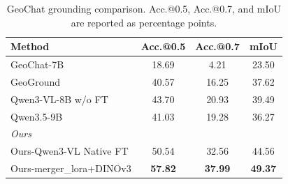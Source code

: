 \begin{table}[t]
  \caption{GeoChat grounding comparison. Acc.@0.5, Acc.@0.7, and mIoU are reported as percentage points.}
  \label{tab:GeoChat_grounding}
  \vspace{5pt}
  \centering
  \scriptsize
  \setlength{\tabcolsep}{6pt}
  \renewcommand{\arraystretch}{1.08}
  \begin{tabular}{lccc}
    \toprule
    Method & Acc.@0.5 & Acc.@0.7 & mIoU \\
    \midrule
    GeoChat-7B                       & 18.69          & 4.21           & 23.50          \\
    GeoGround                        & 40.57          & 16.25          & 37.62          \\
    Qwen3-VL-8B w/o FT               & 43.70          & 20.93          & 39.49          \\
    Qwen3.5-9B                       & 41.03          & 19.28          & 36.27          \\
    \midrule
    \multicolumn{4}{l}{\textit{Ours}} \\
    Ours-Qwen3-VL Native FT           & 50.54          & 32.56          & 44.56          \\
    Ours-merger\_lora+DINOv3          & \textbf{57.82} & \textbf{37.99} & \textbf{49.37} \\
    \bottomrule
  \end{tabular}
\end{table}
